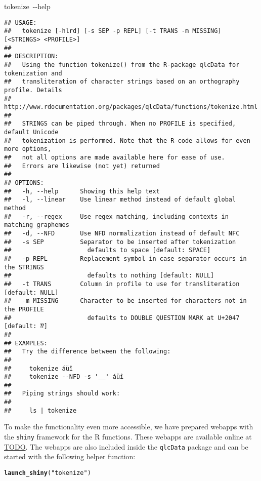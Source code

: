 \documentclass[output=inprep,
		biblatex
		]{LSP/langsci}\usepackage[]{graphicx}\usepackage[]{color}
\makeatletter
\newcommand{\hlstr}[1]{\textcolor[rgb]{0.192,0.494,0.8}{#1}}%
\newcommand{\hlopt}[1]{\textcolor[rgb]{0,0,0}{#1}}%
\newcommand{\hlstd}[1]{\textcolor[rgb]{0.345,0.345,0.345}{#1}}%
\newcommand{\hlkwb}[1]{\textcolor[rgb]{0.69,0.353,0.396}{#1}}%
\newcommand{\hlkwd}[1]{\textcolor[rgb]{0.737,0.353,0.396}{\textbf{#1}}}%
\newenvironment{kframe}{%
 \def\at@end@of@kframe{}%
 \ifinner\ifhmode%
  \def\at@end@of@kframe{\end{minipage}}%
  \begin{minipage}{\columnwidth}%
 \fi\fi%
 \def\FrameCommand##1{\hskip\@totalleftmargin \hskip-\fboxsep
 \colorbox{shadecolor}{##1}\hskip-\fboxsep
     \hskip-\linewidth \hskip-\@totalleftmargin \hskip\columnwidth}%
 \MakeFramed {\advance\hsize-\width
   \@totalleftmargin\z@ \linewidth\hsize
   \@setminipage}}%
 {\par\unskip\endMakeFramed%
 \at@end@of@kframe}
\newenvironment{knitrout}{}{} %
\makeatother
\begin{document}
\begin{knitrout}\tiny
{}\color{fgcolor}\begin{kframe}
\noindent
\ttfamily
\hlstd{tokenize\ }\hlopt{{-}{-}}\hlstd{}\hlkwb{help}\hlstd{}\hspace*{\fill}
\mbox{}
\normalfont

\begin{verbatim}
## USAGE: 
##   tokenize [-hlrd] [-s SEP -p REPL] [-t TRANS -m MISSING] [<STRINGS> <PROFILE>]
## 
## DESCRIPTION:
##   Using the function tokenize() from the R-package qlcData for tokenization and
##   transliteration of character strings based on an orthography profile. Details
##   http://www.rdocumentation.org/packages/qlcData/functions/tokenize.html
## 
##   STRINGS can be piped through. When no PROFILE is specified, default Unicode
##   tokenization is performed. Note that the R-code allows for even more options,
##   not all options are made available here for ease of use.
##   Errors are likewise (not yet) returned
## 
## OPTIONS:
##   -h, --help      Showing this help text
##   -l, --linear    Use linear method instead of default global method
##   -r, --regex     Use regex matching, including contexts in matching graphemes
##   -d, --NFD       Use NFD normalization instead of default NFC
##   -s SEP          Separator to be inserted after tokenization
##                     defaults to space [default: SPACE]
##   -p REPL         Replacement symbol in case separator occurs in the STRINGS
##                     defaults to nothing [default: NULL]
##   -t TRANS        Column in profile to use for transliteration [default: NULL]
##   -m MISSING      Character to be inserted for characters not in the PROFILE
##                     defaults to DOUBLE QUESTION MARK at U+2047 [default: ⁇]
## 
## EXAMPLES:
##   Try the difference between the following:
## 
##     tokenize áüî
##     tokenize --NFD -s '__' áüî
##   
##   Piping strings should work:
##   
##     ls | tokenize
\end{verbatim}
\end{kframe}
\end{knitrout}

To make the functionality even more accessible, we have prepared webapps with 
the \texttt{shiny} framework for the R functions. These webapps are available 
online at \url{TODO}. The webapps are also included inside the \texttt{qlcData} 
package and can be started with the following helper function:

\begin{knitrout}\footnotesize
{}\color{fgcolor}\begin{kframe}
\begin{alltt}
\hlkwd{launch_shiny}\hlstd{(}\hlstr{"tokenize"}\hlstd{)}
\end{alltt}
\end{kframe}
\end{knitrout}
\end{document}
